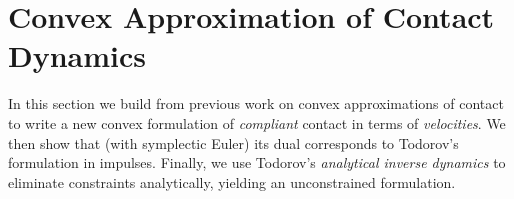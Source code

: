 
\section{Convex Approximation of Contact Dynamics}
\label{sec:convex_approximation}

In this section we build from previous work on convex approximations of contact
\cite{bib:anitescu2006, bib:todorov2011, bib:todorov2014} to write a new convex
formulation of \emph{compliant} contact in terms of \emph{velocities}.  We then
show that (with symplectic Euler) its dual corresponds to
Todorov's~\cite{bib:todorov2014} formulation in impulses. Finally, we use
Todorov's \textit{analytical inverse dynamics} to eliminate constraints
analytically, yielding an unconstrained formulation.




